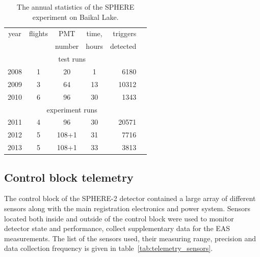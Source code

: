 \documentclass[final,5p,times,twocolumn]{elsarticle}
\begin{document}
\begin{table}[tb]
\centering
\caption{The annual statistics of the SPHERE experiment on Baikal Lake.
}
\label{tab:statistics}
\vspace{1pc}
\begin{tabular}{|c||c|c|c|r|r|}
\hline
year  & flights & PMT    & time, & triggers \\ 
      &         & number & hours & detected \\ 
\hline \hline
\multicolumn{5}{|c|}{test runs} \\
\hline
2008 & 1 &  20 &  1 &  6180 \\ 
2009 & 3 &  64 & 13 & 10312 \\ 
2010 & 6 &  96 & 30 &  1343 \\
\hline
\multicolumn{5}{|c|}{experiment runs} \\
\hline
2011 & 4 &  96 & 30 & 20571 \\
2012 & 5 & 108+1 & 31 &  7716 \\
2013 & 5 & 108+1 & 33 &  3813 \\
\hline
\end{tabular}
\end{table}

\subsection{Control block telemetry}

The control block of the SPHERE-2 detector contained a large array of different sensors along with the main registration electronics and power system. Sensors located both inside and outside of the control block were used to monitor detector state and performance, collect supplementary data for the EAS measurements. The list of the sensors used, their measuring range, precision and data collection frequency is given in table~\ref{tab:telemetry_sensors}. 
\end{document}
